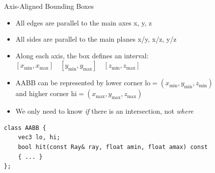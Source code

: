 \documentclass[utf8,stillsansserifmath,fleqn,t]{beamer}
\begin{document}
\begin{frame}[fragile,label=aabb]
\frametitle{\insertsection}
Axis-Aligned Bounding Boxes
\begin{itemize}
\item All edges are parallel to the main axes x, y, z
\item All sides are parallel to the main planes x/y, x/z, y/z
\item Along each axis, the box defines an interval:
$[x_{\min},x_{\max}] \quad [y_{\min},y_{\max}] \quad [z_{\min},z_{\max}]$
\item AABB can be represented by lower corner $\text{lo} = (x_{\min}, y_{\min}, z_{\min})$\\
and higher corner $\text{hi} = (x_{\max}, y_{\max}, z_{\max})$
\item We only need to know \emph{if} there is an intersection, not \emph{where}
\end{itemize}
\begin{lstlisting}
class AABB {
    vec3 lo, hi;
    bool hit(const Ray& ray, float amin, float amax) const
    { ... }
};
\end{lstlisting}
\end{frame}
\end{document}
